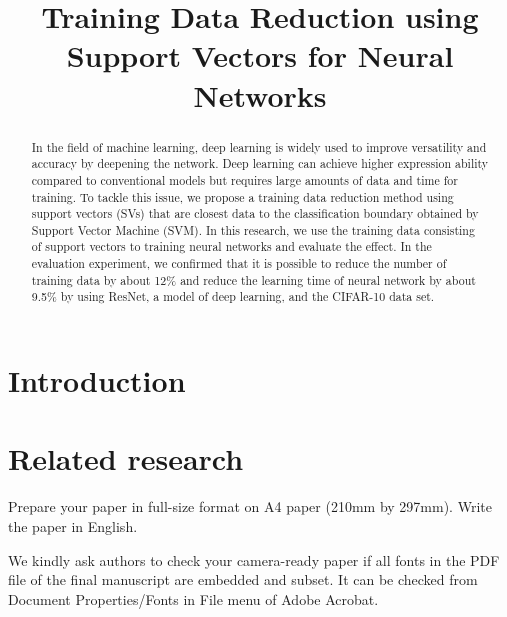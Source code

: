 \documentclass[conference,a4paper]{APSIPA2018}
\begin{document}
\title{Training Data Reduction using Support Vectors for Neural Networks}

\author{%
%
%
%
}


\maketitle
\thispagestyle{empty}

\begin{abstract}
  In the field of machine learning, deep learning is widely used to 
improve versatility and accuracy by deepening the network. Deep learning 
can achieve higher expression ability compared to conventional models 
but requires large amounts of data and time for training. To tackle this 
issue, we propose a training data reduction method using support vectors 
(SVs) that are closest data to the classification boundary obtained by 
Support Vector Machine (SVM). In this research, we use the training data 
consisting of support vectors to training neural networks and evaluate 
the effect. In the evaluation experiment, we confirmed that it is 
possible to reduce the number of training data by about 12\% and reduce 
the learning time of neural network by about 9.5\% by using ResNet, a 
model of deep learning, and the CIFAR-10 data set.
\end{abstract}

\section{Introduction}



\section{Related research}

Prepare your paper in full-size format on
A4 paper (210mm by 297mm).  Write the paper in English.

We kindly ask authors to check your camera-ready paper if all fonts in
the PDF file of the final manuscript are embedded and subset. It can
be checked from Document Properties/Fonts in File menu of Adobe
Acrobat.
\end{document}

